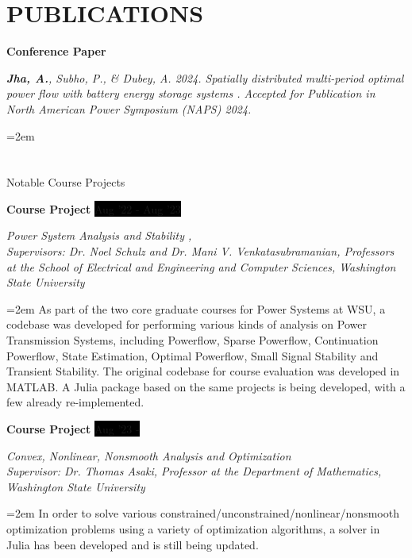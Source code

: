 \documentclass[paper=a4,fontsize=11pt]{scrartcl} %
\newcommand{\sepspace}{\vspace*{1em}}		%
\newcommand{\NewPart}[1]{\section*{\uppercase{#1}}}
\newcommand{\EducationEntry}[4]{
		\noindent \textbf{#1} \hfill      %
		\colorbox{Black}{%
			\parbox{10em}{%
			\hfill\color{White}#2}} \par  %
		\noindent \textit{#3} \par        %
		\noindent\hangindent=2em\hangafter=0 \small #4 %
		\normalsize \par}
\newcommand{\WorkEntry}[4]{				  %
		\noindent \textbf{#1} \hfill      %
		\colorbox{Black}{\color{White}#2} \par  %
		\noindent \textit{#3} \par              %
		\noindent\hangindent=2em\hangafter=0 \small #4 %
		\normalsize \par}
\begin{document}


\clearpage

\NewPart{Publications}{}

\WorkEntry{Conference Paper}{}{\textbf{Jha, A.}, Subho, P., \& Dubey, A. 2024. Spatially distributed multi-period optimal power flow with battery energy storage systems . Accepted for Publication in North American Power Symposium (NAPS) 2024.}


\NewPart{Notable Course Projects}{}

\WorkEntry{Course Project}{Aug '22 - Aug '23}{Power System Analysis and Stability \href{https://github.com/Realife-Brahmin/PowerSystems-Analysis-Stability-WSU}{\textcolor{matlaborange}{\faGithub}}, \href{https://github.com/ninadkgaikwad/PowerEdu}{\textcolor{juliapurple}{ \faGithub }} \\ Supervisors: Dr. Noel Schulz and Dr. Mani V. Venkatasubramanian, Professors at the School of Electrical and Engineering and Computer Sciences, Washington State University}{As part of the two core graduate courses for Power Systems at WSU, a codebase was developed for performing various kinds of analysis on Power Transmission Systems, including Powerflow, Sparse Powerflow, Continuation Powerflow, State Estimation, Optimal Powerflow, Small Signal Stability and Transient Stability. The original codebase for course evaluation was developed in MATLAB. A Julia package based on the same projects is being developed, with a few already re-implemented.}

\sepspace

\WorkEntry{Course Project}{Aug '23 - }{Convex, Nonlinear, Nonsmooth Analysis and Optimization \href{https://github.com/Realife-Brahmin/WSU-Convex-Nonlinear-Nonsmooth-Analysis-and-Optimization}{\textcolor{juliapurple}{\faGithub}} \\ Supervisor: Dr. Thomas Asaki, Professor at the Department of Mathematics, Washington State University}{In order to solve various constrained/unconstrained/nonlinear/nonsmooth optimization problems using a variety of optimization algorithms, a solver in Julia has been developed and is still being updated.}
\end{document}
